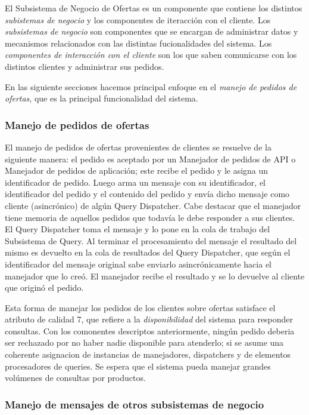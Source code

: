 El \textsf{Subsistema de Negocio de Ofertas} es un componente que contiene los distintos \emph{subistemas de negocio} y los componentes de iteracción con el cliente. Los \emph{subsistemas de negocio} son componentes que se encargan de administrar datos y mecanismos relacionados con las distintas fucionalidades del sistema. Los \emph{componentes de interacción con el cliente} son los que saben comunicarse con los distintos clientes y administrar sus pedidos.

En las siguiente secciones hacemos principal enfoque en el \emph{manejo de pedidos de ofertas}, que es la principal funcionalidad del sistema.

\subsubsection{Manejo de pedidos de ofertas}

El manejo de pedidos de ofertas provenientes de clientes se resuelve de la siguiente manera: el pedido es aceptado por un \textsf{Manejador de pedidos de API} o \textsf{Manejador de pedidos de aplicación}; este recibe el pedido y le asigna un identificador de pedido. Luego arma un mensaje con su identificador, el identificador del pedido y el contenido del pedido y env\'ia dicho mensaje como cliente (asincrónico) de alg\'un \textsf{Query Dispatcher}. Cabe destacar que el manejador tiene memoria de aquellos pedidos que todavía le debe responder a sus clientes. El \textsf{Query Dispatcher} toma el mensaje y lo pone en la cola de trabajo del \textsf{Subsistema de Query}. Al terminar el procesamiento del mensaje el resultado del mismo es devuelto en la cola de resultados del \textsf{Query Dispatcher}, que seg\'un el identificador del mensaje original sabe enviarlo asincrónicamente hacia el manejador que lo creó. El manejador recibe el resultado y se lo devuelve al cliente que originó el pedido.

Esta forma de manejar los pedidos de los clientes sobre ofertas satisface el atributo de calidad 7, que refiere a la \emph{disponibilidad} del sistema para responder consultas. Con los comonentes descriptos anteriormente, ning\'un pedido deberia ser rechazado por no haber nadie disponible para atenderlo; si se asume una coherente asignacion de instancias de manejadores, dispatchers y de elementos procesadores de queries. Se espera que el sistema pueda manejar grandes volúmenes de consultas por productos.

\subsubsection{Manejo de mensajes de otros subsistemas de negocio}

